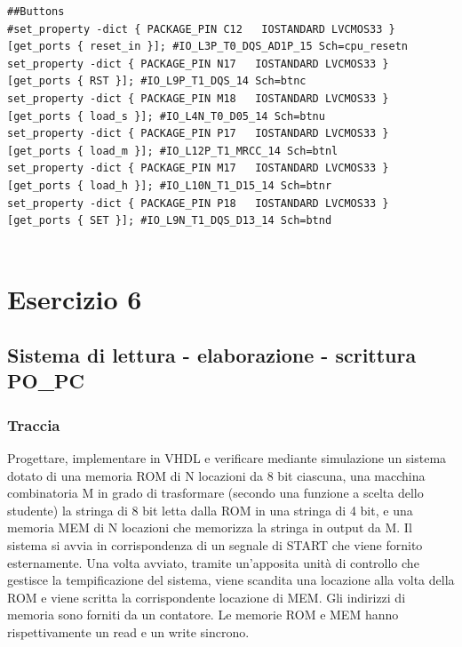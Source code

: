 {\begin{verbatim}
##Buttons
#set_property -dict { PACKAGE_PIN C12   IOSTANDARD LVCMOS33 } 
[get_ports { reset_in }]; #IO_L3P_T0_DQS_AD1P_15 Sch=cpu_resetn
set_property -dict { PACKAGE_PIN N17   IOSTANDARD LVCMOS33 } 
[get_ports { RST }]; #IO_L9P_T1_DQS_14 Sch=btnc
set_property -dict { PACKAGE_PIN M18   IOSTANDARD LVCMOS33 } 
[get_ports { load_s }]; #IO_L4N_T0_D05_14 Sch=btnu
set_property -dict { PACKAGE_PIN P17   IOSTANDARD LVCMOS33 } 
[get_ports { load_m }]; #IO_L12P_T1_MRCC_14 Sch=btnl
set_property -dict { PACKAGE_PIN M17   IOSTANDARD LVCMOS33 } 
[get_ports { load_h }]; #IO_L10N_T1_D15_14 Sch=btnr
set_property -dict { PACKAGE_PIN P18   IOSTANDARD LVCMOS33 } 
[get_ports { SET }]; #IO_L9N_T1_DQS_D13_14 Sch=btnd


\end{verbatim}
}


\chapter{Esercizio 6}
\section{Sistema di lettura - elaborazione - scrittura PO\_PC}
\subsection{Traccia}
 Progettare, implementare in VHDL e verificare mediante simulazione un sistema dotato di una memoria ROM di N locazioni da 8 bit ciascuna, una macchina combinatoria M in grado di trasformare (secondo una funzione a scelta dello studente) la stringa di 8 bit letta dalla ROM in una stringa di 4 bit, e una memoria MEM di N locazioni che memorizza la stringa in output da M. Il sistema si avvia in corrispondenza di un segnale di START che viene fornito esternamente. Una volta avviato, tramite un’apposita unità di controllo che gestisce la tempificazione del sistema, viene scandita una locazione alla volta della ROM e viene scritta la corrispondente locazione di MEM. Gli indirizzi di memoria sono forniti da un contatore. Le memorie ROM e MEM hanno rispettivamente un read e un write sincrono.
